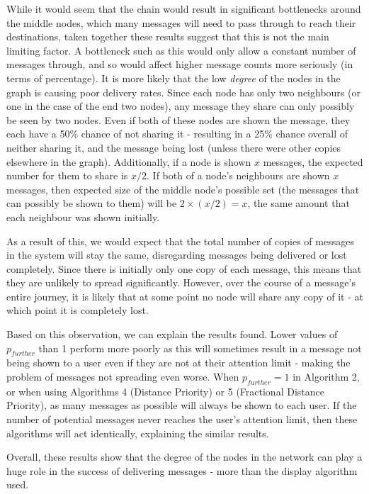 \documentclass[bsc,frontabs,twoside,singlespacing,parskip,deptreport]{infthesis}     %
\begin{document}
While it would seem that the chain would result in significant bottlenecks around the middle nodes, which many messages will need to pass through to reach their destinations, taken together these results suggest that this is not the main limiting factor. A bottleneck such as this would only allow a constant number of messages through, and so would affect higher message counts more seriously (in terms of percentage). It is more likely that the low \textit{degree} of the nodes in the graph is causing poor delivery rates. Since each node has only two neighbours (or one in the case of the end two nodes), any message they share can only possibly be seen by two nodes. Even if both of these nodes are shown the message, they each have a 50\% chance of not sharing it - resulting in a 25\% chance overall of neither sharing it, and the message being lost (unless there were other copies elsewhere in the graph). Additionally, if a node is shown $x$ messages, the expected number for them to share is $x/2$. If both of a node's neighbours are shown $x$ messages, then expected size of the middle node's possible set (the messages that can possibly be shown to them) will be $2 \times (x/2) = x$, the same amount that each neighbour was shown initially.

As a result of this, we would expect that the total number of copies of messages in the system will stay the same, disregarding messages being delivered or lost completely. Since there is initially only one copy of each message, this means that they are unlikely to spread significantly. However, over the course of a message's entire journey, it is likely that at some point no node will share any copy of it - at which point it is completely lost.

Based on this observation, we can explain the results found. Lower values of $p_{further}$ than 1 perform more poorly as this will sometimes result in a message not being shown to a user even if they are not at their attention limit - making the problem of messages not spreading even worse. When $p_{further}=1$ in Algorithm 2, or when using Algorithms 4 (Distance Priority) or 5 (Fractional Distance Priority), as many messages as possible will always be shown to each user. If the number of potential messages never reaches the user's attention limit, then these algorithms will act identically, explaining the similar results.

Overall, these results show that the degree of the nodes in the network can play a huge role in the success of delivering messages - more than the display algorithm used.
\end{document}
